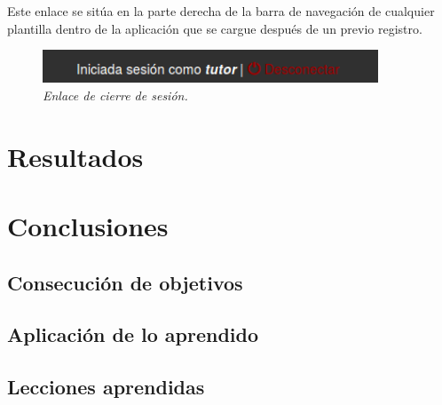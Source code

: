 \documentclass[a4paper, 12pt]{book}
\begin{document}
Este enlace se sit\'ua en la parte derecha de la barra de navegaci\'on de cualquier plantilla dentro de la aplicaci\'on que se cargue despu\'es de un previo
registro.
\begin{figure}
  \centering
  \includegraphics[width=10cm, keepaspectratio]{imagenes/CierreSesion}
  \caption{\textit{Enlace de cierre de sesi\'on.}}
  \label{fig:cierresesion}
\end{figure}



\cleardoublepage
\chapter{Resultados}





\cleardoublepage
\chapter{Conclusiones}
\label{chap:conclusiones}


\section{Consecuci\'on de objetivos}
\label{sec:consecucion-objetivos}


\section{Aplicaci\'on de lo aprendido}
\label{sec:aplicacion}



\section{Lecciones aprendidas}
\label{sec:lecciones_aprendidas}
\end{document}
